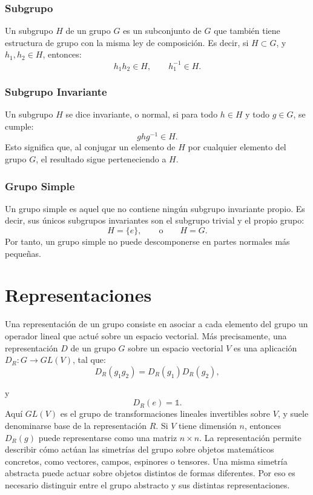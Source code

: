 \documentclass[a4paper,11pt]{book} %
\begin{document}
\subsubsection{Subgrupo}
\noindent
Un subgrupo \(H\) de un grupo \(G\) es un subconjunto de \(G\) que también tiene estructura de grupo con la misma ley de composición. Es decir, si $H \subset G$, y \(h_1,h_2 \in H\), entonces:
\begin{equation}
    h_1 h_2 \in H,
    \qquad
    h^{-1}_1 \in H.
\end{equation}
\subsubsection{Subgrupo Invariante}
\noindent
Un subgrupo \(H\) se dice invariante, o normal, si para todo \(h\in H\) y todo \(g\in G\), se cumple:
\begin{equation}
    g h g^{-1} \in H.
\end{equation}
\noindent
Esto significa que, al conjugar un elemento de \(H\) por cualquier elemento del grupo \(G\), el resultado sigue perteneciendo a \(H\).
\subsubsection{Grupo Simple}
\noindent
Un grupo simple es aquel que no contiene ningún subgrupo invariante propio. Es decir, sus únicos subgrupos invariantes son el subgrupo trivial y el propio grupo:
\begin{equation}
    H = \{e\},
    \qquad
    \text{o}
    \qquad
    H = G.
\end{equation}
\noindent
Por tanto, un grupo simple no puede descomponerse en partes normales más pequeñas.
\section{Representaciones}
\noindent
Una representación de un grupo consiste en asociar a cada elemento del grupo
un operador lineal que actué sobre un espacio vectorial. Más precisamente, una representación \(D\) de un grupo \(G\) sobre un espacio vectorial \(V\) es una aplicación $D_R : G \longrightarrow GL(V)$, tal que:
\begin{equation}
    D_R(g_1 g_2)
    =
    D_R(g_1)D_R(g_2),
\end{equation}

y
\begin{equation}
    D_R(e)=\mathds{1}.
\end{equation}
\noindent
Aquí \(GL(V)\) es el grupo de transformaciones lineales invertibles sobre
\(V\), y suele denominarse base de la representación $R$. Si \(V\) tiene dimensión \(n\), entonces \(D_R(g)\) puede representarse como una matriz \(n\times n\).
\medskip\newline
La representación permite describir cómo actúan las simetrías del grupo sobre objetos matemáticos concretos, como vectores, campos, espinores o tensores. Una misma simetría abstracta puede actuar sobre objetos distintos de formas diferentes. Por eso es necesario distinguir entre el grupo abstracto y sus distintas representaciones.
\end{document}
